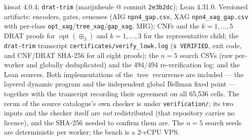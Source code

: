 \documentclass[11pt]{article}
\DeclareMathOperator{\opt}{opt}
\DeclareMathOperator{\tree}{tree}
\theoremstyle{plain}
\begin{document}
\begin{sloppypar}
kissat 4.0.4; \texttt{drat-trim} (marijnheule @ commit \texttt{2e3b2dc}); Lean 4.31.0. Versioned
artifacts: encoders, gates, censuses (AIG \texttt{npn4\_gap.csv}, XAG \texttt{npn4\_xag\_gap.csv}
with per-class \texttt{opt\_xag}/\texttt{tree\_xag}/\texttt{gap\_xag}, MIG); CNFs and the
$k = 1,\dots,5$ DRAT proofs for $\opt(\oplus_3)$ and $k = 1,\dots,3$ for the representative child;
the \texttt{drat-trim} transcript \texttt{certificates/verify\_lowk.log} (\texttt{s VERIFIED}, exit code,
and CNF/DRAT SHA-256 for all eight proofs); the $n = 5$ search CSVs (raw per-worker and globally
deduplicated) and the 494/494 re-verification log; and the Lean sources. Both implementations of
the $\tree$ recurrence are included --- the layered dynamic program and the independent global
Bellman fixed point --- together with the transcript recording their agreement on all
65{,}536 cells. The rerun of the source catalogue's own checker is under
\texttt{verification/}; its two inputs and the checker itself are \emph{not} redistributed
(that repository carries no licence), and the SHA-256 needed to confirm them are. The $n = 5$
search seeds are deterministic per worker; the bench is a 2-vCPU VPS.
\end{sloppypar}
\end{document}
